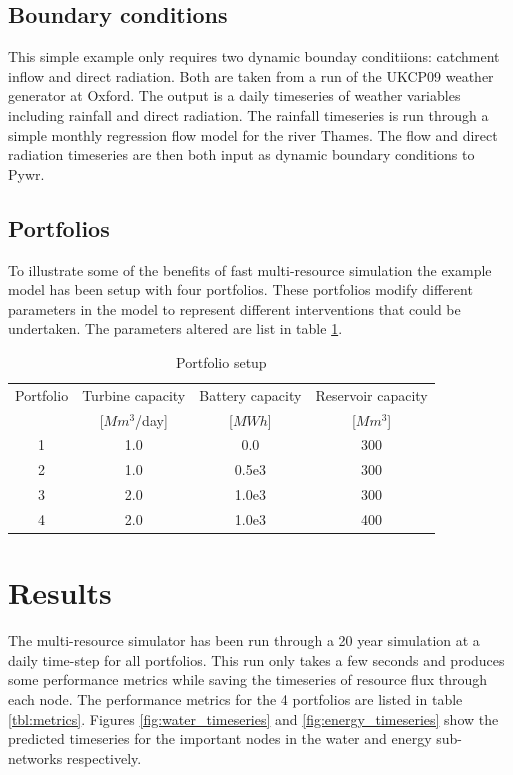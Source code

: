 \documentclass[11pt,twoside,a4paper]{article}
\begin{document}
\subsection{Boundary conditions}

This simple example only requires two dynamic bounday conditiions: catchment inflow and direct radiation. Both are taken from a run of the UKCP09 weather generator at Oxford. The output is a daily timeseries of weather variables including rainfall and direct radiation. The rainfall timeseries is run through a simple monthly regression flow model for the river Thames. The flow and direct radiation timeseries are then both input as dynamic boundary conditions to Pywr. 

\subsection{Portfolios}

To illustrate some of the benefits of fast multi-resource simulation the example model has been setup with four portfolios. These portfolios modify different parameters in the model to represent different interventions that could be undertaken. The parameters altered are list in table \ref{tbl:portfolios}. 


\begin{table}
\begin{tabular}{ | c | c | c | c | }
\hline
Portfolio & Turbine capacity & Battery capacity  & Reservoir capacity \\
 &   [$Mm^3$/day] & [$MWh$] &  [$Mm^3$] \\
\hline
1 & 1.0 & 0.0     & 300 \\
2 & 1.0 & 0.5e3 & 300 \\
3 & 2.0 & 1.0e3 & 300 \\
4 & 2.0 & 1.0e3 & 400 \\
\hline
\end{tabular}
\caption{Portfolio setup}
\label{tbl:portfolios}
\end{table}

\section{Results}

The multi-resource simulator has been run through a 20 year simulation at a daily time-step for all portfolios. This run only takes a few seconds and produces some performance metrics while saving the timeseries of resource flux through each node. The performance metrics for the 4 portfolios are listed in table \ref{tbl:metrics}. Figures \ref{fig:water_timeseries} and \ref{fig:energy_timeseries} show the predicted timeseries for the important nodes in the water and energy sub-networks respectively. 
\end{document}
